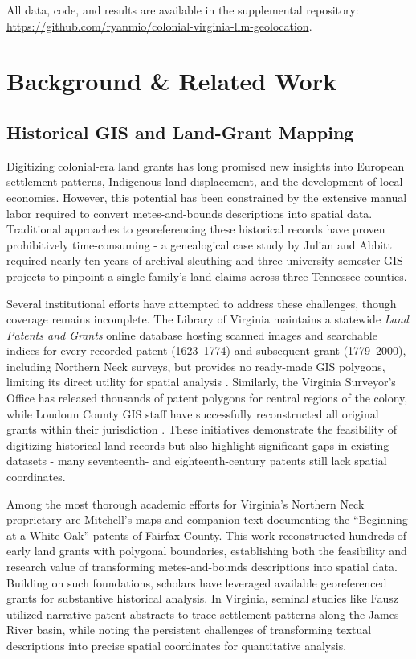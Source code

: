 All data, code, and results are available in the supplemental
repository:
\url{https://github.com/ryanmio/colonial-virginia-llm-geolocation}.

\section{Background \& Related Work}\label{background-related-work}

\subsection{Historical GIS and Land-Grant
Mapping}\label{historical-gis-and-land-grant-mapping}

Digitizing colonial-era land grants has long promised new insights into
European settlement patterns, Indigenous land displacement, and the
development of local economies. However, this potential has been
constrained by the extensive manual labor required to convert
metes-and-bounds descriptions into spatial data. Traditional approaches
to georeferencing these historical records have proven prohibitively
time-consuming - a genealogical case study by Julian and Abbitt
\citep{Julian2014_tennessee} required nearly ten years of archival
sleuthing and three university-semester GIS projects to pinpoint a
single family's land claims across three Tennessee counties.

Several institutional efforts have attempted to address these
challenges, though coverage remains incomplete. The Library of Virginia
maintains a statewide \emph{Land Patents and Grants} online database
hosting scanned images and searchable indices for every recorded patent
(1623--1774) and subsequent grant (1779--2000), including Northern Neck
surveys, but provides no ready-made GIS polygons, limiting its direct
utility for spatial analysis \citep{lva_patents_db}. Similarly, the
Virginia Surveyor's Office has released thousands of patent polygons for
central regions of the colony, while Loudoun County GIS staff have
successfully reconstructed all original grants within their jurisdiction
\citep{loudoun_grants_dataset}. These initiatives demonstrate the
feasibility of digitizing historical land records but also highlight
significant gaps in existing datasets - many seventeenth- and
eighteenth-century patents still lack spatial coordinates.

Among the most thorough academic efforts for Virginia's Northern Neck
proprietary are Mitchell's \citep{mitchell1977whiteoak} maps and
companion text documenting the ``Beginning at a White Oak'' patents of
Fairfax County. This work reconstructed hundreds of early land grants
with polygonal boundaries, establishing both the feasibility and
research value of transforming metes-and-bounds descriptions into
spatial data. Building on such foundations, scholars have leveraged
available georeferenced grants for substantive historical analysis. In
Virginia, seminal studies like Fausz \citep{Fausz1971_settlement}
utilized narrative patent abstracts to trace settlement patterns along
the James River basin, while noting the persistent challenges of
transforming textual descriptions into precise spatial coordinates for
quantitative analysis.

